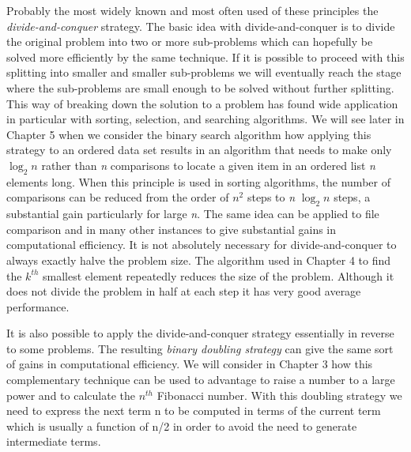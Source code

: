 \documentclass{book}
\begin{document}
	Probably the most widely known and most often used of these principles the \textit{divide-and-conquer} strategy. The basic idea with divide-and-conquer is to divide the original problem into two or more sub-problems which can hopefully be solved more efficiently by the same technique. If it is possible to proceed with this splitting into smaller and smaller sub-problems we will eventually reach the stage where the sub-problems are small enough to be solved without further splitting. This way of breaking down the solution to a problem has found wide application in particular with sorting, selection, and searching algorithms. We will see later in Chapter 5 when we consider the binary search algorithm how applying this strategy to an ordered data set results in an algorithm that needs to make only $\log_{2}n$ rather than \textit{n} comparisons to locate a given item in an ordered list \textit{n} elements long. When this principle is used in sorting algorithms, the number of comparisons can be reduced from the order of $n^2$ steps to \textit{n} $\log_{2}n$ steps, a substantial gain particularly for large \textit{n}. The same idea can be applied to file comparison and in many other instances to give substantial gains in computational efficiency. It is not absolutely necessary for divide-and-conquer to always exactly halve the problem size. The algorithm used in Chapter 4 to find the $k^{th}$ smallest element repeatedly reduces the size of the problem. Although it does not divide the problem in half at each step it has very good average performance.\par 

	It is also possible to apply the divide-and-conquer strategy essentially in reverse to some problems. The resulting \textit{binary doubling strategy} can give the same sort of gains in computational efficiency. We will consider in Chapter 3 how this complementary technique can be used to advantage to raise a number to a large power and to calculate the $n^{th}$ Fibonacci number. With this doubling strategy we need to express the next term n to be computed in terms of the current term which is usually a function of n/2 in order to avoid the need to generate intermediate terms.\par
\end{document}
